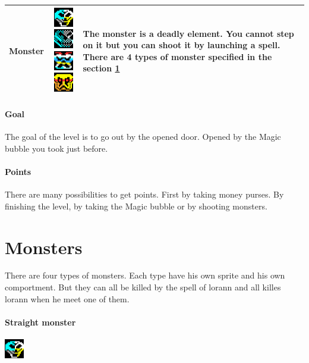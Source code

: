 \documentclass{report}
\begin{document}
\begin{center}
\begin{tabulary}{0.9\linewidth}{|c|c|L|}
\hline
Monster & \includegraphics[scale=0.7]{resources/sprites/monster_1.png}\includegraphics[scale=0.7]{resources/sprites/monster_2.png}\includegraphics[scale=0.7]{resources/sprites/monster_3.png}\includegraphics[scale=0.7]{resources/sprites/monster_4.png} & The monster is a deadly element. You cannot step on it but you can shoot it by launching a spell. There are 4 types of monster specified in the section \ref{monsters}\\
\hline
\end{tabulary}
\end{center}

\paragraph{Goal} The goal of the level is to go out by the opened door. Opened by the Magic bubble you took just before.

\paragraph{Points} There are many possibilities to get points. First by taking money purses. By finishing the level, by taking the Magic bubble or by shooting monsters.

\section{Monsters}
\label{monsters}

There are four types of monsters. Each type have his own sprite and his own comportment. But they can all be killed by the spell of lorann and all killes lorann when he meet one of them.

\paragraph{Straight monster}
\hspace{\fill}\includegraphics{resources/sprites/monster_1.png}
\end{document}
